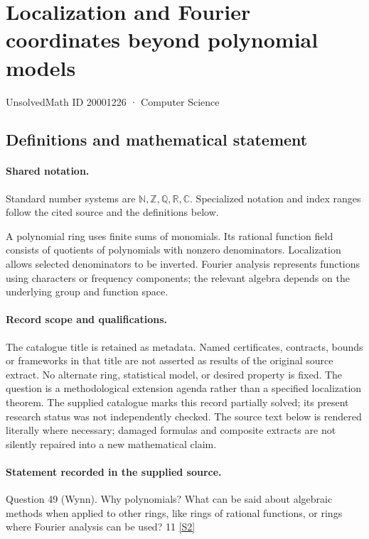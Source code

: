 \documentclass[11pt]{article}
\newcommand{\sref}[2]{\hyperlink{source:#1:#2}{[S#2]}}
\begin{document}
\setcounter{section}{20001225}
\section{Localization and Fourier coordinates beyond polynomial models}\label{20001226}
{\small\sffamily UnsolvedMath ID 20001226 · Computer Science}
\subsection{Definitions and mathematical statement}

\paragraph{Shared notation.}Standard number systems are $\mathbb N,\mathbb Z,\mathbb Q,\mathbb R,\mathbb C$. Specialized notation and index ranges follow the cited source and the definitions below.


A polynomial ring uses finite sums of monomials. Its rational function field consists of quotients of polynomials with nonzero denominators. Localization allows selected denominators to be inverted. Fourier analysis represents functions using characters or frequency components; the relevant algebra depends on the underlying group and function space.
\paragraph{Record scope and qualifications.}
The catalogue title is retained as metadata. Named certificates, contracts, bounds or frameworks in that title are not asserted as results of the original source extract.
No alternate ring, statistical model, or desired property is fixed. The question is a methodological extension agenda rather than a specified localization theorem. The supplied catalogue marks this record partially solved; its present research status was not independently checked.
The source text below is rendered literally where necessary; damaged formulas and composite extracts are not silently repaired into a new mathematical claim.
\paragraph{Statement recorded in the supplied source.}
Question 49 (Wynn). Why polynomials? What can be said about algebraic methods when applied to other rings, like rings of rational functions, or rings where Fourier analysis can be used? 11 \sref{20001226}{2}
\end{document}
